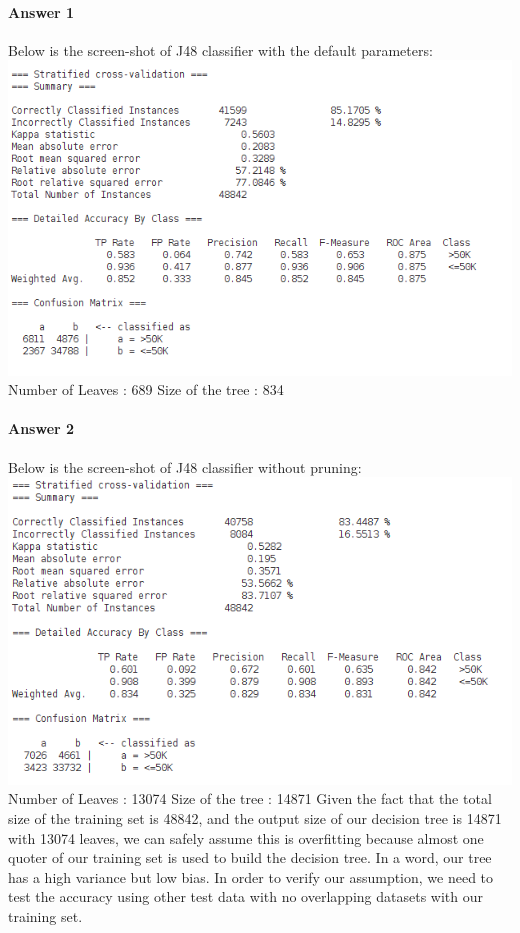 \documentclass[paper=a4, fontsize=11pt]{scrartcl} %
\numberwithin{equation}{section} %
\numberwithin{figure}{section} %
\numberwithin{table}{section} %
\begin{document}
\paragraph{Answer 1}
Below is the screen-shot of J48 classifier with the default parameters: \\
\includegraphics[scale=0.65]{question1.png}\label{Summary for default parameters J48 classifier} \\
Number of Leaves  : 	689   Size of the tree : 	834 
\paragraph{Answer 2}
Below is the screen-shot of J48 classifier without pruning: \\
\includegraphics[scale=0.65]{question2.png}\label{Summary for default parameters J48 classifier without prunning} \\
Number of Leaves  : 	13074  Size of the tree : 	14871
Given the fact that the total size of the training set is 48842, and the output size of our decision tree is 14871 with 13074 leaves, we can safely assume this is overfitting because almost one quoter of our training set is used to build the decision tree. In a word, our tree has a high variance but low bias. In order to verify our assumption, we need to test the accuracy using other test data with no overlapping datasets with our training set.
\end{document}
